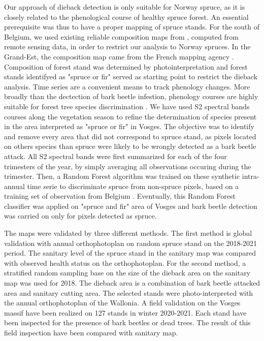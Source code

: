 \documentclass[3p,procedia]{elsarticle}
\begin{document}
Our approach of dieback detection is only suitable for Norway spruce, as it is closely related to the phenological course of healthy spruce forest.
An essential prerequisite was thus to have a proper mapping of spruce stands.
For the south of Belgium, we used existing reliable composition maps from \cite{bolyn_mapping_2022}, computed from remote sensing data, in order to restrict our analysis to Norway spruces.
In the Grand-Est, the composition map came from the French mapping agency \citep{IGN_bd_2018}. 
Composition of forest stand was determined by photointerpretation and forest stands identifyed as "spruce or fir" served as starting point to restrict the dieback analysis.
Time series are a convenient means to track phenology changes. 
More broadly than the dectection of bark beetle infestion, phenology courses are highly suitable for forest tree species discrimination \citep{lisein_discrimination_2015,grabska_forest_2019,ma_tree_2021}.
We have used S2 spectral bands courses along the vegetation season to refine the determination of species present in the area interpreted as "spruce or fir" in Vosges.
The objective was to identify and remove every area that did not correspond to spruce stand, as pixels located on others species than spruce were likely to be wrongly detected as a bark beetle attack.
All S2 spectral bands were first summarized for each of the four trimesters of the year, by simply averaging all observations occuring during the trimester.
Then, a Random Forest algorithm was trained on these synthetic intra-annual time serie to discriminate spruce from non-spruce pixels, based on a training set of observation from Belgium \citep{bolyn_forest_2018}.
Eventually, this Random Forest classifier was applied on "spruce and fir" area of Vosges and bark beetle detection was carried on only for pixels detected as spruce. 

The maps were validated by three different methods.
The first method is global validation with annual orthophotoplan on random spruce stand on the 2018-2021 period. The sanitary level of the spruce stand in the sanitary map was compared with observed health status on the orthophotoplan.
For the second method, a stratified random sampling base on the size of the dieback area on the sanitary map was used for 2018.
The dieback area is a combination of bark beetle attacked area and sanitary cutting area. 
The selected stands were photo-interpreted with the annual orthophotoplan of the Wallonia.
A field validation on the Vosges massif have been realized on 127 stands in winter 2020-2021.
Each stand have been inspected for the presence of bark beetles or dead trees. 
The result of this field inspection have been compared with sanitary map. 
\end{document}
